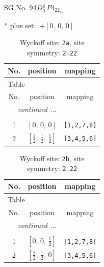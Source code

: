 \documentclass[fleqn,8pt]{jsarticle}
\begin{document}
\setcounter{MaxMatrixCols}{32}

\renewcommand{\tablename}{Table~}
\renewcommand{\figurename}{Figure~}
\begin{center}
\LARGE
SG No. 94\quad$D_{\rm 4}^{6}$\quad$P4_22_12$\quad[ tetragonal ]
\end{center}
* plus set:\,\,\,$+\left[ 0,\, 0,\, 0 \right]$
\renewcommand{\arraystretch}{1.2}
\begin{longtable}{ccc}
\caption{Wyckoff site: {\tt 2a}, site symmetry: {\tt 2.22}}
 \\
 \hline \hline
No. & position & mapping \\ \hline \endfirsthead

\multicolumn{2}{l}{\tablename\ \thetable{}} \\
 \hline \hline
No. & position & mapping \\ \hline \endhead

 \hline \hline
\multicolumn{2}{r}{\footnotesize\it continued ...} \\ \endfoot

 \hline \hline
\multicolumn{2}{r}{} \\ \endlastfoot

1 & $\left[ 0,\, 0,\, 0 \right]$ & {\tt [1,2,7,8]} \\ \hline
2 & $\left[ \frac{1}{2},\, \frac{1}{2},\, \frac{1}{2} \right]$ & {\tt [3,4,5,6]} \\
\end{longtable}
\renewcommand{\arraystretch}{1.2}
\begin{longtable}{ccc}
\caption{Wyckoff site: {\tt 2b}, site symmetry: {\tt 2.22}}
 \\
 \hline \hline
No. & position & mapping \\ \hline \endfirsthead

\multicolumn{2}{l}{\tablename\ \thetable{}} \\
 \hline \hline
No. & position & mapping \\ \hline \endhead

 \hline \hline
\multicolumn{2}{r}{\footnotesize\it continued ...} \\ \endfoot

 \hline \hline
\multicolumn{2}{r}{} \\ \endlastfoot

1 & $\left[ 0,\, 0,\, \frac{1}{2} \right]$ & {\tt [1,2,7,8]} \\ \hline
2 & $\left[ \frac{1}{2},\, \frac{1}{2},\, 0 \right]$ & {\tt [3,4,5,6]} \\
\end{longtable}
\end{document}
